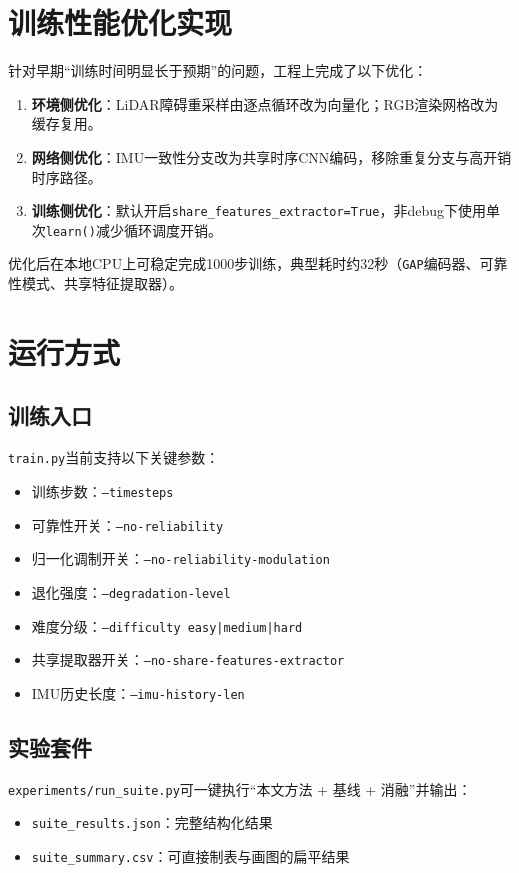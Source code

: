 \section{训练性能优化实现}
针对早期“训练时间明显长于预期”的问题，工程上完成了以下优化：
\begin{enumerate}
    \item \textbf{环境侧优化}：LiDAR障碍重采样由逐点循环改为向量化；RGB渲染网格改为缓存复用。
    \item \textbf{网络侧优化}：IMU一致性分支改为共享时序CNN编码，移除重复分支与高开销时序路径。
    \item \textbf{训练侧优化}：默认开启\texttt{share\_features\_extractor=True}，非debug下使用单次\texttt{learn()}减少循环调度开销。
\end{enumerate}

优化后在本地CPU上可稳定完成1000步训练，典型耗时约32秒（\texttt{GAP}编码器、可靠性模式、共享特征提取器）。

\section{运行方式}
\subsection{训练入口}
\texttt{train.py}当前支持以下关键参数：
\begin{itemize}
    \item 训练步数：\texttt{--timesteps}
    \item 可靠性开关：\texttt{--no-reliability}
    \item 归一化调制开关：\texttt{--no-reliability-modulation}
    \item 退化强度：\texttt{--degradation-level}
    \item 难度分级：\texttt{--difficulty easy|medium|hard}
    \item 共享提取器开关：\texttt{--no-share-features-extractor}
    \item IMU历史长度：\texttt{--imu-history-len}
\end{itemize}

\subsection{实验套件}
\texttt{experiments/run\_suite.py}可一键执行“本文方法 + 基线 + 消融”并输出：
\begin{itemize}
    \item \texttt{suite\_results.json}：完整结构化结果
    \item \texttt{suite\_summary.csv}：可直接制表与画图的扁平结果
\end{itemize}

